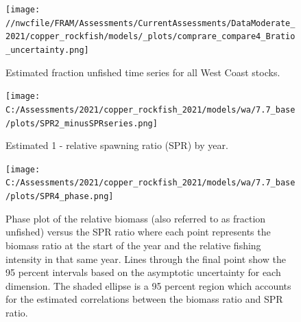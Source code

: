 \documentclass[11pt,
  english,
  a4paper,
]{article}
\begin{document}
\tagmcend\tagstructend


\begin{figure}
\centering
\texttt{[image: //nwcfile/FRAM/Assessments/CurrentAssessments/DataModerate\_2021/copper\_rockfish/models/\_plots/comprare\_compare4\_Bratio\_uncertainty.png]}
\caption{Estimated fraction unfished time series for all West Coast stocks.\label{fig:depl-compare}}
\end{figure}

\tagmcend\tagstructend

\clearpage


\begin{figure}
\centering
\texttt{[image: C:/Assessments/2021/copper\_rockfish\_2021/models/wa/7.7\_base/plots/SPR2\_minusSPRseries.png]}
\caption{Estimated 1 - relative spawning ratio (SPR) by year.\label{fig:1-spr}}
\end{figure}

\tagmcend\tagstructend


\begin{figure}
\centering
\texttt{[image: C:/Assessments/2021/copper\_rockfish\_2021/models/wa/7.7\_base/plots/SPR4\_phase.png]}
\caption{Phase plot of the relative biomass (also referred to as fraction unfished) versus the SPR ratio where each point represents the biomass ratio at the start of the year and the relative fishing intensity in that same year. Lines through the final point show the 95 percent intervals based on the asymptotic uncertainty for each dimension. The shaded ellipse is a 95 percent region which accounts for the estimated correlations between the biomass ratio and SPR ratio.\label{fig:phase}}
\end{figure}
\end{document}
